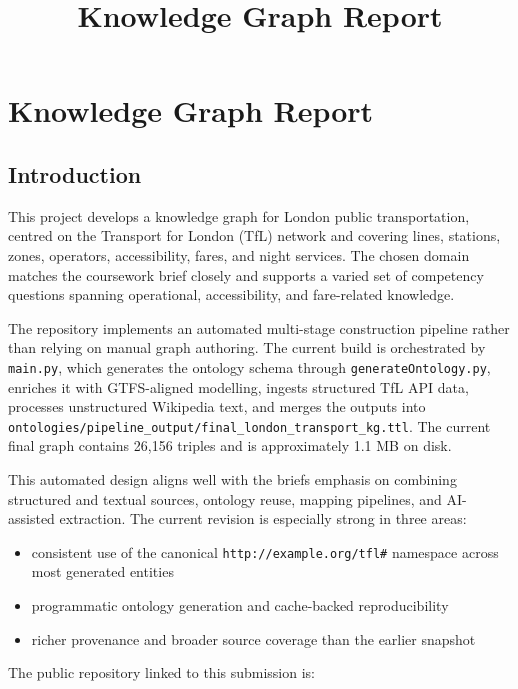 \documentclass[
  11pt,
  a4paper,
]{article}
\title{Knowledge Graph Report}
\author{}
\date{}
\providecommand{\tightlist}{%
  \setlength{\itemsep}{0pt}\setlength{\parskip}{0pt}}
\begin{document}
\maketitle

\section{Knowledge Graph Report}\label{knowledge-graph-report}

\subsection{Introduction}\label{introduction}

This project develops a knowledge graph for London public
transportation, centred on the Transport for London (TfL) network and
covering lines, stations, zones, operators, accessibility, fares, and
night services. The chosen domain matches the coursework brief closely
and supports a varied set of competency questions spanning operational,
accessibility, and fare-related knowledge.

The repository implements an automated multi-stage construction pipeline
rather than relying on manual graph authoring. The current build is
orchestrated by \texttt{main.py}, which generates the ontology schema
through \texttt{generateOntology.py}, enriches it with GTFS-aligned
modelling, ingests structured TfL API data, processes unstructured
Wikipedia text, and merges the outputs into
\texttt{ontologies/pipeline\_output/final\_london\_transport\_kg.ttl}.
The current final graph contains 26,156 triples and is approximately 1.1
MB on disk.

This automated design aligns well with the brief\textquotesingle s
emphasis on combining structured and textual sources, ontology reuse,
mapping pipelines, and AI-assisted extraction. The current revision is
especially strong in three areas:

\begin{itemize}
\tightlist
\item
  consistent use of the canonical \texttt{http://example.org/tfl\#}
  namespace across most generated entities
\item
  programmatic ontology generation and cache-backed reproducibility
\item
  richer provenance and broader source coverage than the earlier
  snapshot
\end{itemize}

The public repository linked to this submission is:
\end{document}
